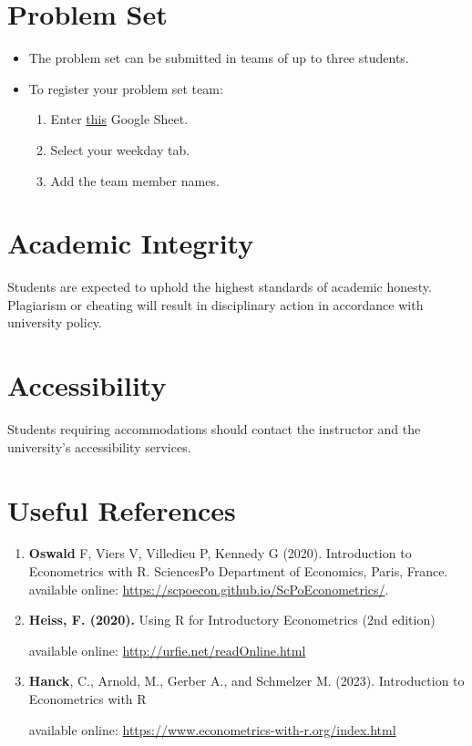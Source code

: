 \documentclass[11pt]{article}
\begin{document}
\section{Problem Set}
\begin{itemize}
    \item The problem set can be submitted in teams of up to three students.
    \item To register your problem set team:
    \begin{enumerate}
        \item Enter \href{https://docs.google.com/spreadsheets/d/1EELY5wWKEA_pHf_HXenjt4S6EhgivH2ieC7nghsS0EE/edit?usp=sharing}{this} Google Sheet.
        \item Select your weekday tab.
        \item Add the team member names.  
    \end{enumerate}
\end{itemize}

\section{Academic Integrity}
Students are expected to uphold the highest standards of academic honesty. Plagiarism or cheating will result in disciplinary action in accordance with university policy.

\section{Accessibility}
Students requiring accommodations should contact the instructor and the university’s accessibility services.

\section{Useful References}
  \begin{enumerate}
    \item \textbf{Oswald} F, Viers V, Villedieu P, Kennedy G (2020).
Introduction to Econometrics with
R. SciencesPo Department of
Economics, Paris, France. \\
available online: \href{https://scpoecon.github.io/ScPoEconometrics/}{https://scpoecon.github.io/ScPoEconometrics/}.
   \item \textbf{Heiss, F. (2020).} Using R for Introductory Econometrics (2nd edition) 

    available online: \href{http://urfie.net/readOnline.html}{http://urfie.net/readOnline.html}
    \item \textbf{Hanck}, C., Arnold, M., Gerber A., and Schmelzer M. (2023). Introduction to Econometrics with R 

        available online: \href{https://www.econometrics-with-r.org/index.html}{https://www.econometrics-with-r.org/index.html}
  \end{enumerate}
\end{document}
